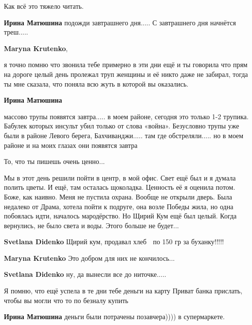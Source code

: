  
 
 
 
 

\qqSecCmt


Как всё это тяжело читать.

\begin{itemize} %
\textbf{Ирина Матюшина} подожди завтрашнего дня..... С завтрашнего дня начнётся треш.....

\textbf{Maryna Krutenko}, 

я точно помню что звонила тебе примерно в эти дни ещё и ты говорила что прям на
дороге целый день пролежал труп женщины и её никто даже не забирал, тогда ты мне
сказала, что поняла всю жуть в которой вы оказались.

\textbf{Ирина Матюшина} 

массово трупы появятся завтра..... в моем районе, сегодня это только 1-2
трупика. Бабулек которых инсульт убил только от слова «война». Безусловно трупы
уже были в районе Левого берега, Бахчиванджи..... там где обстреляли..... но в
моем районе и на моих глазах они появятся завтра

\end{itemize} %


То, что ты пишешь очень ценно...

Мы в этот день решили пойти в центр, в мой офис. Свет ещё был и я думала полить
цветы. И ещё, там осталась щоколадка. Ценность её я оценила потом. Боже, как
наивно. Меня не пустила охрана. Вообще не открыли дверь. Была недалеко от
Драма, хотела пойти к подруге, она возле Победы жила, но одна побоялась идти,
началось мародёрство. Но Щирий Кум ещё был целый. Когда вернулись, не было
света и воды. Этого больше не будет...

\begin{itemize} %
\textbf{Svetlana Didenko} Щирий кум, продавал хлеб 🥖 по 150 гр за буханку!!!!!

\textbf{Maryna Krutenko} Это добром для них не кончилось...

\textbf{Svetlana Didenko} ну, да вынесли все до ниточке.....
\end{itemize} %


Я помню, что ещё успела в те дни тебе деньги на карту Приват банка прислать,
чтобы вы могли что то по безналу купить

\begin{itemize} %
\textbf{Ирина Матюшина} деньги были потрачены позавчера)))) в супермаркете.
\end{itemize} %

